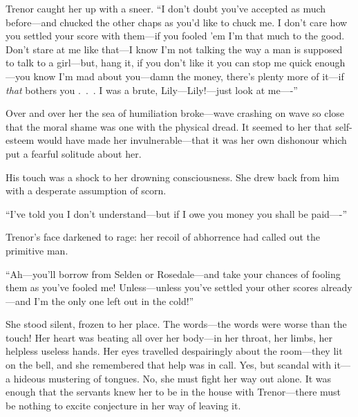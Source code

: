 \documentclass[12pt,a4paper]{book}
\begin{document}
Trenor caught her up with a sneer. ``I don't doubt you've accepted
as much before---and chucked the other chaps as you'd like to
chuck me. I don't care how you settled your score with them---if
you fooled 'em I'm that much to the good. Don't stare at me like
that---I know I'm not talking the way a man is supposed to talk to
a girl---but, hang it, if you don't like it you can stop me quick
enough---you know I'm mad about you---damn the money, there's
plenty more of it---if \textit{that} bothers you .\ .\ . I was a brute,
Lily---Lily!---just look at me----''





Over and over her the sea of humiliation broke---wave crashing on
wave so close that the moral shame was one with the physical
dread. It seemed to her that self-esteem would have made
her invulnerable---that it was her own dishonour which put a
fearful solitude about her.





His touch was a shock to her drowning consciousness. She drew
back from him with a desperate assumption of scorn.





``I've told you I don't understand---but if I owe you money you
shall be paid----''





Trenor's face darkened to rage: her recoil of abhorrence had
called out the primitive man.





``Ah---you'll borrow from Selden or Rosedale---and take your chances
of fooling them as you've fooled me! Unless---unless you've
settled your other scores already---and I'm the only one left out
in the cold!''





She stood silent, frozen to her place. The words---the words were
worse than the touch! Her heart was beating all over her body---in
her throat, her limbs, her helpless useless hands. Her eyes
travelled despairingly about the room---they lit on the bell, and
she remembered that help was in call. Yes, but scandal with it---a
hideous mustering of tongues. No, she must fight her way out
alone. It was enough that the servants knew her to be in the
house with Trenor---there must be nothing to excite conjecture in
her way of leaving it.
\end{document}
